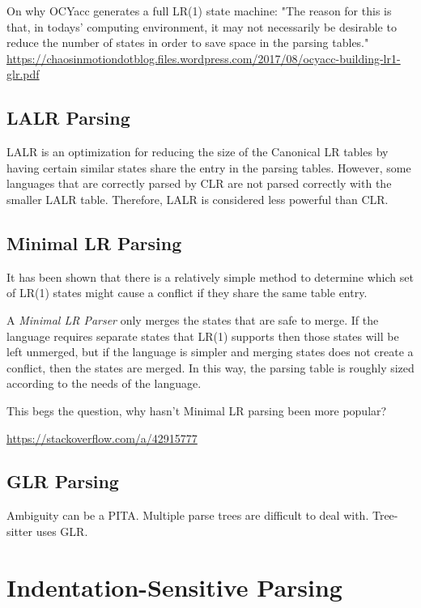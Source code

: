 \documentclass{book}
\newcommand{\newterm}[2]{\textit{#1}\index{#2}}
\begin{document}
On why OCYacc generates a full LR(1) state machine:
"The reason for this is that, in todays' computing environment, it may not necessarily be desirable to reduce
the number of states in order to save space in the parsing tables."\\
\url{https://chaosinmotiondotblog.files.wordpress.com/2017/08/ocyacc-building-lr1-glr.pdf}

\section{LALR Parsing}
LALR is an optimization for reducing the size of the Canonical LR
tables by having certain similar states share the entry in the
parsing tables.
However, some languages that are correctly parsed by CLR
are not parsed correctly with the smaller LALR table. Therefore,
LALR is considered less powerful than CLR. 

\section{Minimal LR Parsing}
It has been shown that there is a relatively simple
method to determine which set of LR(1) states might cause 
a conflict if they share the same table entry.

A \newterm{Minimal LR Parser}{Minimal LR Parser}
only merges the states that are safe to merge.  
If the language requires separate states that
LR(1) supports then those states will be left unmerged, but 
if the language is simpler and merging states does not create
a conflict, then the states are merged.
In this way, the parsing table is roughly sized according to the needs of
the language.

This begs the question, why hasn't Minimal LR parsing been
more popular?

\url{https://stackoverflow.com/a/42915777}

\section{GLR Parsing}
Ambiguity can be a PITA. Multiple parse trees are difficult to deal with.
Tree-sitter uses GLR.

%
%
\chapter{Indentation-Sensitive Parsing}
\end{document}

